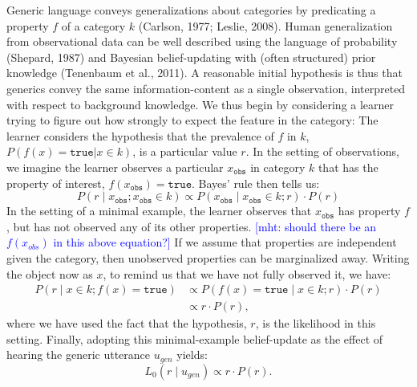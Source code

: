 \documentclass[floatsintext,doc]{apa6}
\newcommand{\mht}[1]{{\textcolor{Blue}{[mht: #1]}}}
\begin{document}
Generic language conveys generalizations about categories by predicating a property $f$ of a category $k$ (Carlson, 1977; Leslie, 2008).
Human generalization from observational data can be well described using the language of probability (Shepard, 1987) and Bayesian belief-updating with (often structured) prior knowledge (Tenenbaum et al., 2011).
A reasonable initial hypothesis is thus that generics convey the same information-content as a single observation, interpreted with respect to background knowledge.
We thus begin by considering a learner trying to figure out how strongly to expect the feature in the category: The learner considers the hypothesis that the prevalence of $f$ in $k$, $P(f(x){=}\texttt{true} | x\in k)$, is a particular value $r$. In the setting of observations, we imagine the learner observes a particular $x_\texttt{obs}$ in category $k$ that has the property of interest, $f(x_\texttt{obs})=\texttt{true}$. Bayes' rule then tells us:
$$
P(r \mid x_\texttt{obs}; x_\texttt{obs} \in k) \propto P( x_\texttt{obs} \mid x_\texttt{obs}\in k; r) \cdot P(r)
$$
In the setting of a minimal example, the learner observes that $x_\texttt{obs}$ has property $f$, but has not observed any of its other properties.
\mht{should there be an $f(x_{obs})$ in this above equation?}
If we assume that properties are independent given the category, then unobserved properties can be marginalized away. Writing the object now as $x$, to remind us that we have not fully observed it, we have:
\begin{align}
P(r \mid x \in k; f(x){=}\texttt{true}) &\propto P(f(x){=}\texttt{true} \mid x \in k; r) \cdot P(r) \nonumber \\
&\propto r\cdot P(r), \nonumber
\end{align}
where we have used the fact that the hypothesis, $r$, is the likelihood in this setting.
Finally, adopting this minimal-example belief-update as the effect of hearing the generic utterance $u_{gen}$ yields:
\begin{equation}
L_0(r \mid u_{gen}) \propto  r \cdot P(r). 
\label{eq:L0}
\end{equation}
\end{document}

